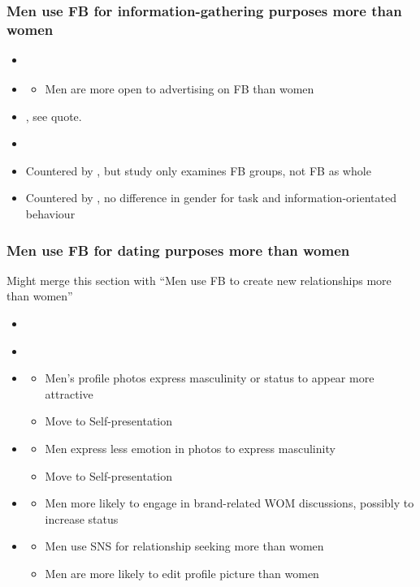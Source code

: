 \subsubsection{Men use FB for information-gathering purposes more than women}
\begin{itemize}
\item \citet{Raacke2008}
\item \citet{Choi2014}
	\begin{itemize}
	\item Men are more open to advertising on FB than women
	\end{itemize}
\item \citet{Muscanell2012}, see quote.
\item \citet{Kimbrough2013}
\item Countered by \citet{Park2009}, but study only examines FB groups, not FB as whole
\item Countered by \citet{Haferkamp2012}, no difference in gender for task and information-orientated behaviour
\end{itemize}

\subsubsection{Men use FB for dating purposes more than women}

Might merge this section with ``Men use FB to create new relationships more than women''
\begin{itemize}
\item \citet{Muscanell2012}
\item \citet{Raacke2008}
\item \citet{Tifferet2014}
	\begin{itemize}
	\item Men's profile photos express masculinity or status to appear more attractive
	\item Move to Self-presentation
	\end{itemize}
\item \citet{McAndrew2012}
	\begin{itemize}
	\item Men express less emotion in photos to express masculinity
	\item Move to Self-presentation
	\end{itemize}
\item \citet{Choi2014}
	\begin{itemize}
	\item Men more likely to engage in brand-related WOM discussions, possibly to increase status
	\end{itemize}
\item \citet{Haferkamp2012}
	\begin{itemize}
	\item Men use SNS for relationship seeking more than women
	\item Men are more likely to edit profile picture than women
	\end{itemize}
\end{itemize}

